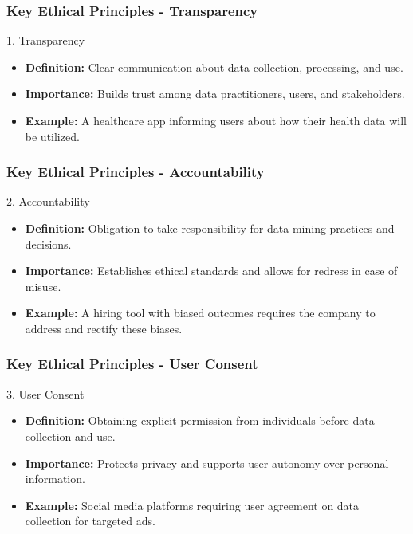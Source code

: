 \documentclass[aspectratio=169]{beamer}
\begin{document}
\begin{frame}[fragile]
    \frametitle{Key Ethical Principles - Transparency}
    \begin{block}{1. Transparency}
        \begin{itemize}
            \item \textbf{Definition:} Clear communication about data collection, processing, and use.
            \item \textbf{Importance:} Builds trust among data practitioners, users, and stakeholders.
            \item \textbf{Example:} A healthcare app informing users about how their health data will be utilized.
        \end{itemize}
    \end{block}
\end{frame}

\begin{frame}[fragile]
    \frametitle{Key Ethical Principles - Accountability}
    \begin{block}{2. Accountability}
        \begin{itemize}
            \item \textbf{Definition:} Obligation to take responsibility for data mining practices and decisions.
            \item \textbf{Importance:} Establishes ethical standards and allows for redress in case of misuse.
            \item \textbf{Example:} A hiring tool with biased outcomes requires the company to address and rectify these biases.
        \end{itemize}
    \end{block}
\end{frame}

\begin{frame}[fragile]
    \frametitle{Key Ethical Principles - User Consent}
    \begin{block}{3. User Consent}
        \begin{itemize}
            \item \textbf{Definition:} Obtaining explicit permission from individuals before data collection and use.
            \item \textbf{Importance:} Protects privacy and supports user autonomy over personal information.
            \item \textbf{Example:} Social media platforms requiring user agreement on data collection for targeted ads.
        \end{itemize}
    \end{block}
\end{frame}
\end{document}
